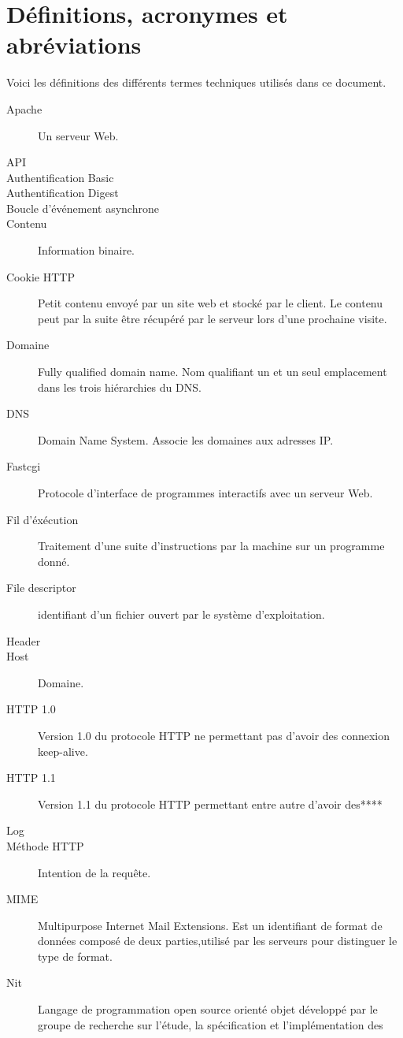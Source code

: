\documentclass{scrreprt}
\begin{document}
\section{Définitions, acronymes et abréviations}
Voici les définitions des différents termes techniques utilisés dans ce
document.
\begin{description}
    \item[Apache] Un serveur Web.
	\item[API]
	\item[Authentification Basic]
    \item[Authentification Digest]
	\item[Boucle d'événement asynchrone]
    \item[Contenu] Information binaire.
    \item[Cookie HTTP] Petit contenu envoyé par un site web et stocké par le client. Le contenu peut par la suite être récupéré par le serveur lors d'une prochaine visite.
    \item[Domaine] Fully qualified domain name. Nom qualifiant un et un seul emplacement dans les trois hiérarchies du DNS.
    \item[DNS] Domain Name System. Associe les domaines aux adresses IP.
    \item[Fastcgi] Protocole d'interface de programmes interactifs avec un serveur Web. 
    \item[Fil d'éxécution] Traitement d'une suite d'instructions par la machine sur un programme donné.
    \item[File descriptor] identifiant d'un fichier ouvert par le système d'exploitation. 
 	\item[Header]
    \item[Host] Domaine.	
	\item[HTTP 1.0] Version 1.0 du protocole HTTP ne permettant pas d'avoir des
connexion keep-alive.
	\item[HTTP 1.1] Version 1.1 du protocole HTTP permettant entre autre d'avoir des****
	\item[Log]   
    \item[Méthode HTTP] Intention de la requête.
	\item[MIME] Multipurpose Internet Mail Extensions. Est un identifiant de format de données composé de deux parties,utilisé par les serveurs pour distinguer le type de format.
	\item[Nit] Langage de programmation open source orienté objet développé par le
groupe de recherche sur l'étude, la spécification et l'implémentation des

\end{description}
\end{document}
